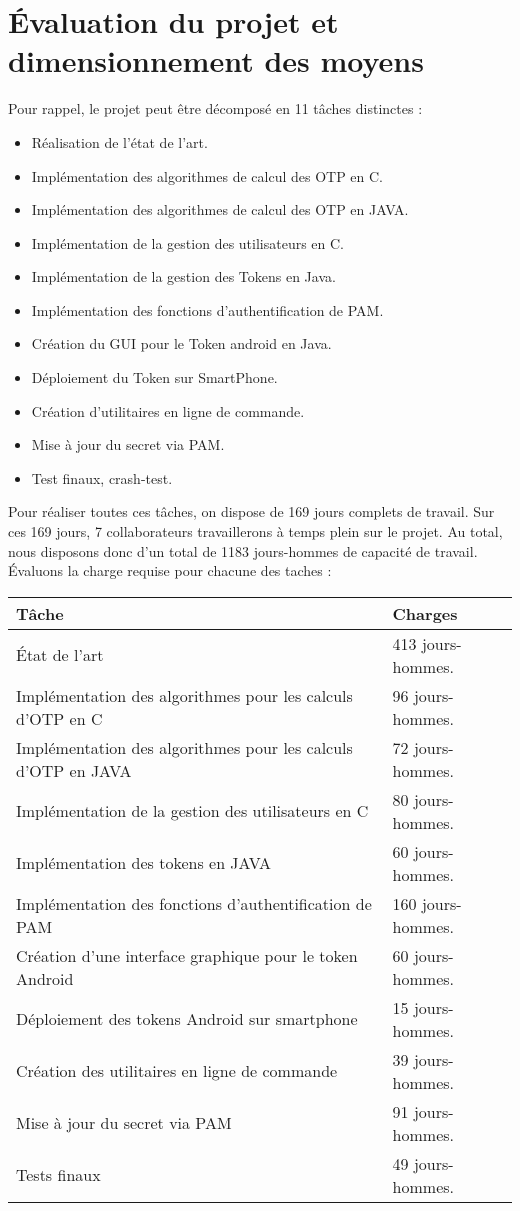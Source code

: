 \documentclass{../../res/univ-projet}
\begin{document}
\section{Évaluation du projet et dimensionnement des moyens}
	Pour rappel, le projet peut être décomposé en 11 tâches distinctes :
	\begin{itemize}
	  \item Réalisation de l'état de l'art.
	  \item Implémentation des algorithmes de calcul des OTP en C.
	  \item Implémentation des algorithmes de calcul des OTP en JAVA.
	  \item Implémentation de la gestion des utilisateurs en C.
	  \item Implémentation de la gestion des Tokens en Java.
	  \item Implémentation des fonctions d'authentification de PAM.
	  \item Création du GUI pour le Token android en Java.
	  \item Déploiement du Token sur SmartPhone.
	  \item Création d'utilitaires en ligne de commande.
	  \item Mise à jour du secret via PAM.
	  \item Test finaux, crash-test.\\
	\end{itemize}

	Pour réaliser toutes ces tâches, on dispose de 169 jours complets de travail. Sur ces 169 jours, 7 collaborateurs travaillerons à temps plein sur le projet. Au total, nous disposons donc d'un total de 1183 jours-hommes de capacité de travail. Évaluons la charge requise pour chacune des taches :\\
	
	\begin{tabular}{|l|l|}
		\hline
		Tâche & Charges\\ 
		\hline
		État de l'art & 413 jours-hommes.\\
		Implémentation des algorithmes pour les calculs d'OTP en C & 96 jours-hommes.\\
		Implémentation des algorithmes pour les calculs d'OTP en JAVA & 72 jours-hommes.\\
		Implémentation de la gestion des utilisateurs en C & 80 jours-hommes.\\
		Implémentation des tokens en JAVA & 60 jours-hommes.\\
		Implémentation des fonctions d'authentification de PAM & 160 jours-hommes.\\
		Création d'une interface graphique pour le token Android & 60 jours-hommes.\\
		Déploiement des tokens Android sur smartphone & 15 jours-hommes.\\
		Création des utilitaires en ligne de commande & 39 jours-hommes.\\
		Mise à jour du secret via PAM & 91 jours-hommes.\\
		Tests finaux & 49 jours-hommes.\\ 
		\hline
	\end{tabular}
	
\end{document}
